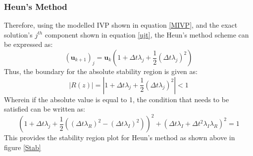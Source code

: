 \documentclass[conf]{new-aiaa}
\begin{document}
        \subsubsection{Heun's Method}
        Therefore, using the modelled IVP shown in equation \eqref{MIVP}, and the exact solution's $j^{th}$ component shown in equation \eqref{ujt}, the Heun's method scheme can be expressed as\cite{StabH}:
        \begin{equation}
        (\bm{u}_{k+1})_j = \bm{u}_{k}\left(1 + \Delta t \lambda_j + \frac{1}{2}(\Delta t \lambda_j)^2\right)
        \end{equation}
        Thus, the boundary for the absolute stability region is given as:
        \begin{equation}
            |R(z)| = \left|1 + \Delta t \lambda_j + \frac{1}{2}(\Delta t \lambda_j)^2\right| < 1
        \end{equation}
        Wherein if the absolute value is equal to 1, the condition that needs to be satisfied can be written as:
       \begin{equation}
           \left(1+ \Delta t \lambda_j + \frac{1}{2}((\Delta t \lambda_R)^2 - (\Delta t \lambda_I)^2)\right)^2 + \left(\Delta t \lambda_I + \Delta t^2 \lambda_I\lambda_R\right)^2 = 1
       \end{equation}
       This provides the stability region plot for Heun's method as shown above in figure \ref{Stab}
       
\end{document}
